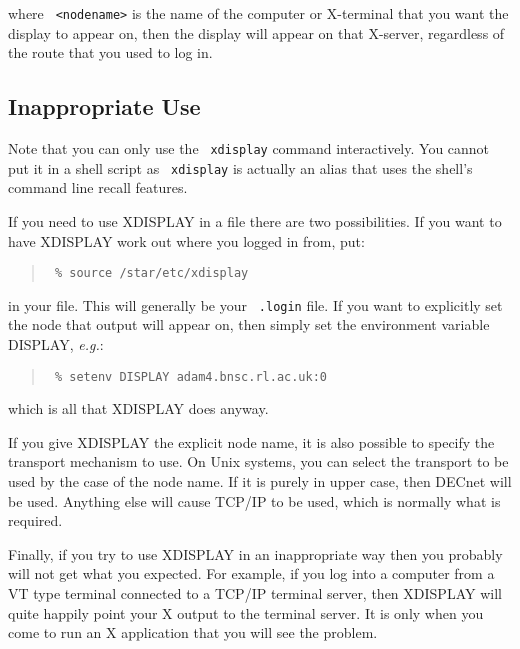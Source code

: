 \documentclass[twoside,11pt]{article}
\newcommand{\xlabel}[1]{}
\renewcommand{\_}{\texttt{\symbol{95}}}
\begin{document}
where \texttt{ <nodename>} is the name of the computer or X-terminal that
you want the display to appear on, then the display will appear on that
X-server, regardless of the route that you used to log in.

\subsection{\label{inappropriate}\xlabel{inappropriate}Inappropriate Use}

Note that you can only use the \texttt{ xdisplay} command interactively.  You
cannot put it in a shell script as \texttt{ xdisplay} is actually an alias
that uses the shell's command line recall features. 

If you need to use XDISPLAY in a file there are two possibilities.  If
you want to have XDISPLAY work out where you logged in from, put:

\begin{quote}\texttt{
\% source /star/etc/xdisplay
}
\end{quote}

in your file. This will generally be your \texttt{ .login} file. If you want to
explicitly set the node that output will appear on, then simply set the
environment variable DISPLAY, \emph{e.g.}:

\begin{quote}\texttt{
\% setenv DISPLAY adam4.bnsc.rl.ac.uk:0
}
\end{quote}

which is all that XDISPLAY does anyway.

If you give XDISPLAY the explicit node name, it is also possible to
specify the transport mechanism to use.  On Unix systems, you can
select the transport to be used by the case of the node name.  If it is
purely in upper case, then DECnet will be used.  Anything else will
cause TCP/IP to be used, which is normally what is required.

Finally, if you try to use XDISPLAY in an inappropriate way then you
probably will not get what you expected.  For example, if you log into a
computer from a VT type terminal connected to a TCP/IP terminal server,
then XDISPLAY will quite happily point your X output to the terminal
server. It is only when you come to run an X application that you will
see the problem.
\end{document}
